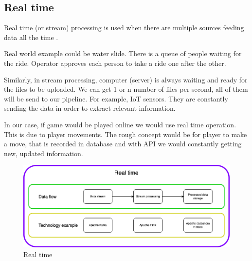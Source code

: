 \subsection{Real time}\label{RealTime}

Real time (or stream) processing is used when there are multiple sources feeding data all the time \parencite{wu2020reactive}.

Real world example could be water slide. There is a queue of people waiting for the ride. Operator approves each person to take a ride one after the other.  

Similarly, in stream processing, computer (server) is always waiting and ready for the files to be uploaded. We can get 1 or n number of files per second, all of them will be send to our pipeline. For example, IoT sensors. They are constantly sending the data in order to extract relevant information.

In our case, if game would be played online we would use real time operation. This is due to player movements. The rough concept would be for player to make a move, that is recorded in database and with API we would constantly getting new, updated information.


\begin{figure}[H]
\includegraphics[scale=0.45]{img/ProcessingParadigms/BigData-RealTime.png}
\centering
\caption{Real time}
\label{fig:RealTime}
\end{figure}